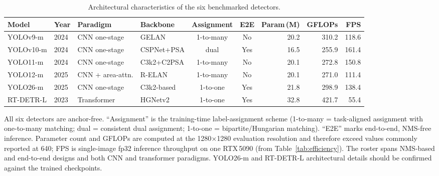 \begin{table}[ht]
  \centering
  \caption{Architectural characteristics of the six benchmarked detectors.}
  \label{tab:detector_arch}
  \begin{tabular}{llllccrrr}
    \toprule
    Model & Year & Paradigm & Backbone & Assignment & E2E & Param\,(M) & GFLOPs & FPS \\
    \midrule
    YOLOv9-m  & 2024 & CNN one-stage    & GELAN        & 1-to-many & No  & 20.2 & 310.2 & 118.6 \\
    YOLOv10-m & 2024 & CNN one-stage    & CSPNet+PSA   & dual      & Yes & 16.5 & 255.9 & 161.4 \\
    YOLO11-m  & 2024 & CNN one-stage    & C3k2+C2PSA   & 1-to-many & No  & 20.1 & 272.8 & 150.8 \\
    YOLO12-m  & 2025 & CNN + area-attn. & R-ELAN       & 1-to-many & No  & 20.1 & 271.0 & 111.4 \\
    YOLO26-m  & 2025 & CNN one-stage    & C3k2-based   & 1-to-one  & Yes & 21.8 & 298.9 & 138.4 \\
    RT-DETR-L & 2023 & Transformer      & HGNetv2      & 1-to-one  & Yes & 32.8 & 421.7 & 55.4  \\
    \bottomrule
  \end{tabular}
  \par\smallskip
  \footnotesize All six detectors are anchor-free. ``Assignment'' is the training-time label-assignment scheme (1-to-many = task-aligned assignment with one-to-many matching; dual = consistent dual assignment; 1-to-one = bipartite/Hungarian matching). ``E2E'' marks end-to-end, NMS-free inference. Parameter count and GFLOPs are computed at the 1280$\times$1280 evaluation resolution and therefore exceed values commonly reported at 640; FPS is single-image fp32 inference throughput on one RTX\,5090 (from Table~\ref{tab:efficiency}). The roster spans NMS-based and end-to-end designs and both CNN and transformer paradigms. YOLO26-m and RT-DETR-L architectural details should be confirmed against the trained checkpoints.
\end{table}
